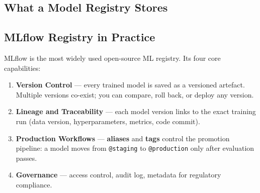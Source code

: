 \documentclass[a4paper,11pt]{article}
\newcommand{\vocab}[1]{\textbf{\color{navy}#1}}
\begin{document}
\subsection{What a Model Registry Stores}

\begin{center}
\end{center}

\subsection{MLflow Registry in Practice}

MLflow is the most widely used open-source ML registry. Its four core capabilities:

\begin{enumerate}
  \item \textbf{Version Control} --- every trained model is saved as a versioned artefact. Multiple versions co-exist; you can compare, roll back, or deploy any version.
  \item \textbf{Lineage and Traceability} --- each model version links to the exact training run (data version, hyperparameters, metrics, code commit).
  \item \textbf{Production Workflows} --- \vocab{aliases} and \vocab{tags} control the promotion pipeline: a model moves from \texttt{@staging} to \texttt{@production} only after evaluation passes.
  \item \textbf{Governance} --- access control, audit log, metadata for regulatory compliance.
\end{enumerate}
\end{document}
